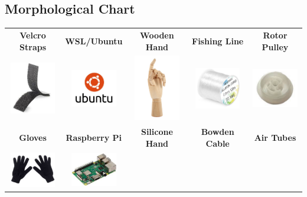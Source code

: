 \documentclass{article}
\begin{document}
\subsection{Morphological Chart}
\begin{table}[h]
    \hspace*{-1.5cm}
    \centering
    \begin{tabular}{|c|c|c|c|c|}
        \hline
        \textbf{Velcro Straps} & \textbf{WSL/Ubuntu} & \textbf{Wooden Hand} & \textbf{Fishing Line} & \textbf{Rotor Pulley} \\
        \includegraphics[width=2cm]{mor1.png} & 
        \includegraphics[width=2cm]{mor2.png} & 
        \includegraphics[width=2cm]{mor3.png} & 
        \includegraphics[width=2cm]{mor4.png} & 
        \includegraphics[width=2cm]{mor5.png} \\
        \hline
        \textbf{Gloves} & \textbf{Raspberry Pi} & \textbf{Silicone Hand} & \textbf{Bowden Cable} & \textbf{Air Tubes} \\
        \includegraphics[width=2cm]{mor6.png} & 
        \includegraphics[width=2cm]{mor7.png} & 

\end{tabular}
\end{table}
\end{document}
